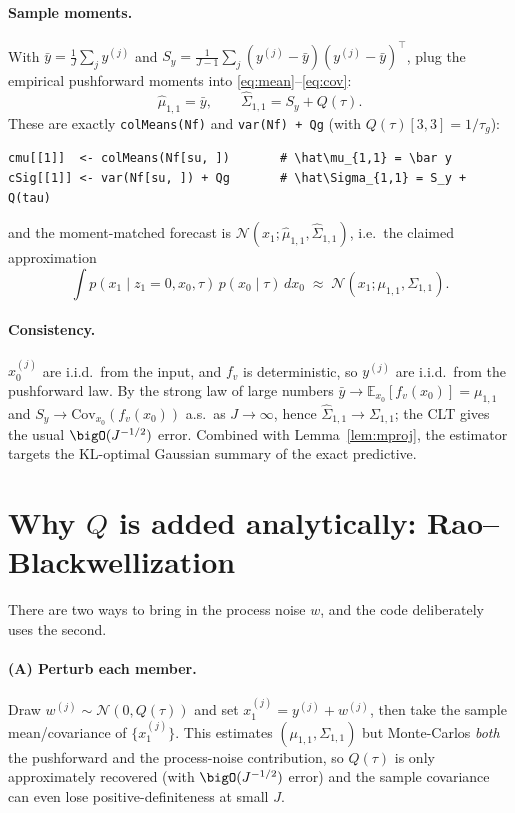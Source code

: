\documentclass[11pt]{article}
\newcommand{\code}[1]{\texttt{#1}}
\newcommand{\E}{\mathbb{E}}
\newcommand{\Cov}{\mathrm{Cov}}
\newcommand{\Norm}{\mathcal{N}}
\begin{document}
\paragraph{Sample moments.} With $\bar y=\tfrac1J\sum_j y^{(j)}$ and
$S_y=\tfrac{1}{J-1}\sum_j (y^{(j)}-\bar y)(y^{(j)}-\bar y)^\top$, plug the empirical
pushforward moments into \eqref{eq:mean}--\eqref{eq:cov}:
\begin{equation}
\label{eq:est}
\boxed{\;\hat\mu_{1,1}=\bar y,\qquad
       \hat\Sigma_{1,1}=S_y+Q(\tau).\;}
\end{equation}
These are exactly \code{colMeans(Nf)} and \code{var(Nf) + Qg} (with
$Q(\tau)[3,3]=1/\tau_g$):
\begin{lstlisting}
cmu[[1]]  <- colMeans(Nf[su, ])       # \hat\mu_{1,1} = \bar y
cSig[[1]] <- var(Nf[su, ]) + Qg       # \hat\Sigma_{1,1} = S_y + Q(tau)
\end{lstlisting}
and the moment-matched forecast is $\Norm(x_1;\hat\mu_{1,1},\hat\Sigma_{1,1})$, i.e.\ the
claimed approximation
\[
\int p(x_1\mid z_1{=}0,x_0,\tau)\,p(x_0\mid\tau)\,dx_0\;\approx\;\Norm(x_1;\mu_{1,1},\Sigma_{1,1}).
\]

\paragraph{Consistency.} $x_0^{(j)}$ are i.i.d.\ from the input, and $f_v$ is
deterministic, so $y^{(j)}$ are i.i.d.\ from the pushforward law. By the strong law of
large numbers $\bar y\to\E_{x_0}[f_v(x_0)]=\mu_{1,1}$ and $S_y\to\Cov_{x_0}(f_v(x_0))$
a.s.\ as $J\to\infty$, hence $\hat\Sigma_{1,1}\to\Sigma_{1,1}$; the CLT gives the usual
$\bigO(J^{-1/2})$ error. Combined with Lemma~\ref{lem:mproj}, the estimator targets the
KL-optimal Gaussian summary of the exact predictive.

\section{Why $Q$ is added analytically: Rao--Blackwellization}
\label{sec:rb}

There are two ways to bring in the process noise $w$, and the code deliberately uses the
second.

\paragraph{(A) Perturb each member.} Draw $w^{(j)}\sim\Norm(0,Q(\tau))$ and set
$x_1^{(j)}=y^{(j)}+w^{(j)}$, then take the sample mean/covariance of $\{x_1^{(j)}\}$.
This estimates $(\mu_{1,1},\Sigma_{1,1})$ but Monte-Carlos \emph{both} the pushforward
and the process-noise contribution, so $Q(\tau)$ is only approximately recovered
(with $\bigO(J^{-1/2})$ error) and the sample covariance can even lose positive-definiteness
at small $J$.
\end{document}
